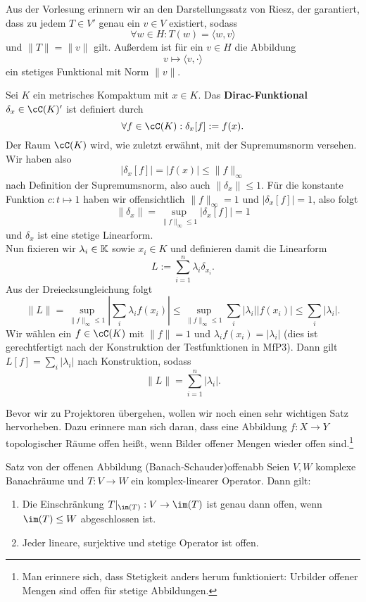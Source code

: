Aus der Vorlesung erinnern wir an den Darstellungssatz von Riesz, der garantiert, dass zu jedem $T \in V'$ genau ein $v \in V$ existiert, sodass
\[
\forall w \in H: T(w)=\langle w, v \rangle
\]
und $\|T\| = \|v\|$ gilt. Außerdem ist für ein $v \in H$ die Abbildung 
\[
v \mapsto \langle v, \cdot \rangle
\]
ein stetiges Funktional mit Norm $\|v\|$.
\begin{beispiel}
	Sei $K$ ein metrisches Kompaktum mit $x \in K$. Das \textbf{Dirac-Funktional} $\delta_x \in \cC(K)'$ ist definiert durch
	\[
		\forall f \in \cC(K): \delta_x[f] := f(x).
	\]
	Der Raum $\cC(K)$ wird, wie zuletzt erwähnt, mit der Supremumsnorm versehen. Wir haben also
	\[
		|\delta_x[f]| = |f(x)| \leq \|f\|_\infty
	\]
	nach Definition der Supremumsnorm, also auch $\| \delta_x \| \leq 1$. Für die konstante Funktion $c: t \mapsto 1$ haben wir offensichtlich $\|f\|_\infty = 1$ und $|\delta_x [f]| = 1$, also folgt
	\[
		\| \delta_x \| = \sup_{\|f\|_\infty \leq 1} | \delta_x[f] | = 1
	\]
	und $\delta_x$ ist eine stetige Linearform.\\
	Nun fixieren wir $\lambda_i \in \mathbb{K}$ sowie $x_i \in K$ und definieren damit die Linearform
	\[
		L := \sum_{i=1}^n \lambda_i \delta_{x_i}.
	\] 
	Aus der Dreiecksungleichung folgt
	\[
		\|L\| = \sup_{\|f\|_\infty \leq 1} \left| \sum_i \lambda_i  f(x_i) \right| \leq \sup_{\|f\|_\infty \leq 1}  \sum_i |\lambda_i| |f(x_i)| \leq \sum_i|\lambda_i|. 
	\]
	Wir wählen ein $f \in \cC(K)$ mit $\|f\| = 1$ und $\lambda_i f(x_i) = |\lambda_i|$ (dies ist gerechtfertigt nach der Konstruktion der Testfunktionen in MfP3). Dann gilt $L[f] = \sum_i |\lambda_i|$ nach Konstruktion, sodass
	\[
		\|L\|= \sum_{i=1}^n |\lambda_i|.
	\]
\end{beispiel}

Bevor wir zu Projektoren übergehen, wollen wir noch einen sehr wichtigen Satz hervorheben. Dazu erinnere man sich daran, dass eine Abbildung $f: X \to Y$ topologischer Räume offen heißt, wenn Bilder offener Mengen wieder offen sind.\footnote{Man erinnere sich, dass Stetigkeit anders herum funktioniert: Urbilder offener Mengen sind offen für stetige Abbildungen.}
\begin{theorem}{Satz von der offenen Abbildung (Banach-Schauder)}{offenabb}
Seien $V,W$ komplexe Banachräume und $T: V \to W$ ein komplex-linearer Operator. Dann gilt:
\begin{enumerate}
	\item Die Einschränkung $T|_{\im(T)}: V \to \im(T)$ ist genau dann offen, wenn $\im(T) \leq W$ abgeschlossen ist.
	\item Jeder lineare, surjektive und stetige Operator ist offen.
\end{enumerate}

\end{theorem}


